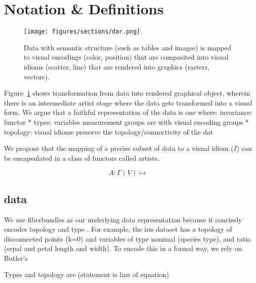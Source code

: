 \documentclass[../intro.tex]{subfiles}
\begin{document}
\section{Notation \& Definitions}
\begin{figure}
    \texttt{[image: figures/sections/dar.png]}
    \caption{Data with semantic structure (such as tables and images) is mapped to visual encodings (color, position) that are composited into visual idioms (scatter, line) that are rendered into graphics (rasters, vectors).}
    \label{fig:artists}
\end{figure}
Figure~\ref{fig:artists} shows transformation from data into rendered graphical object, wherein there is an intermediate artist stage where the data gets transformed into a visual form. We argue that a faithful representation of the data is one where:
invariance:
functor
* types: variables measurement groups are  with visual encoding groups
* topology: visual idioms preserve the topology/connectivity of the dat


We propose that the mapping of a precise subset of data to a visual idiom ($I$) can be encapsulated in a class of functors called artists.

\begin{equation}
    A: \Gamma(V) \mapsto 
\end{equation}

\subsection{data}
We use fiberbundles as our underlying data representation because it concisely encodes topology\cite{butlerVectorBundleClassesForm1992,butlerVisualizationModelBased1989} and type \cite{spivakSIMPLICIALDATABASES}. 
For example, the iris dataset \cite{UCIMachineLearning} has a topology of disconnected points (k=0) and variables of type nominal (species type), and ratio (sepal and petal length and width). To encode this in a formal way, we rely on Butler's 

Types and topology are (statement is line of equation)
\end{document}
